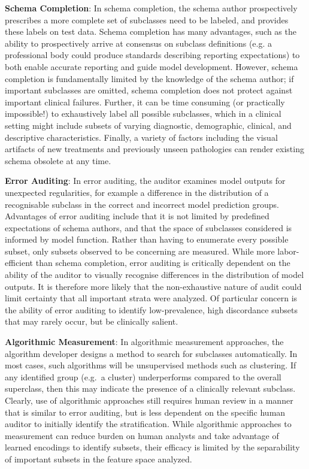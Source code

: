 \documentclass{article}
\begin{document}
\textbf{Schema Completion}: In schema completion, the schema author prospectively prescribes a more complete set of subclasses need to be labeled, and provides these labels on test data. 
Schema completion has many advantages, such as the ability to prospectively arrive at consensus on subclass definitions (e.g. a professional body could produce standards describing reporting expectations) to both enable accurate reporting and guide model development.
However, schema completion is fundamentally limited by the knowledge of the schema author; if important subclasses are omitted, schema completion does not protect against important clinical failures.
Further, it can be time consuming (or practically impossible!) to exhaustively label all possible subclasses, which in a clinical setting might include subsets of varying diagnostic, demographic, clinical, and descriptive characteristics.
Finally, a variety of factors including the visual artifacts of new treatments and previously unseen pathologies can render existing schema obsolete at any time.

\textbf{Error Auditing}: In error auditing, the auditor examines model outputs for unexpected regularities, for example a difference in the distribution of a recognisable subclass in the correct and incorrect model prediction groups. 
Advantages of error auditing include that it is not limited by predefined expectations of schema authors, and that the space of subclasses considered is informed by model function.
Rather than having to enumerate every possible subset, only subsets observed to be concerning are measured.
While more labor-efficient than schema completion, error auditing is critically dependent on the ability of the auditor to visually recognise differences in the distribution of model outputs.
It is therefore more likely that the non-exhaustive nature of audit could limit certainty that all important strata were analyzed.
Of particular concern is the ability of error auditing to identify low-prevalence, high discordance subsets that may rarely occur, but be clinically salient.

\textbf{Algorithmic Measurement}: In algorithmic measurement approaches, the algorithm developer designs a method to search for subclasses automatically. 
In most cases, such algorithms will be unsupervised methods such as clustering. 
If any identified group (e.g.~a cluster) underperforms compared to the overall superclass, then this may indicate the presence of a clinically relevant subclass.
Clearly, use of algorithmic approaches still requires human review in a manner that is similar to error auditing, but is less dependent on the specific human auditor to initially identify the stratification.  
While algorithmic approaches to measurement can reduce burden on human analysts and take advantage of learned encodings to identify subsets, their efficacy is limited by the separability of important subsets in the feature space analyzed.
\end{document}
